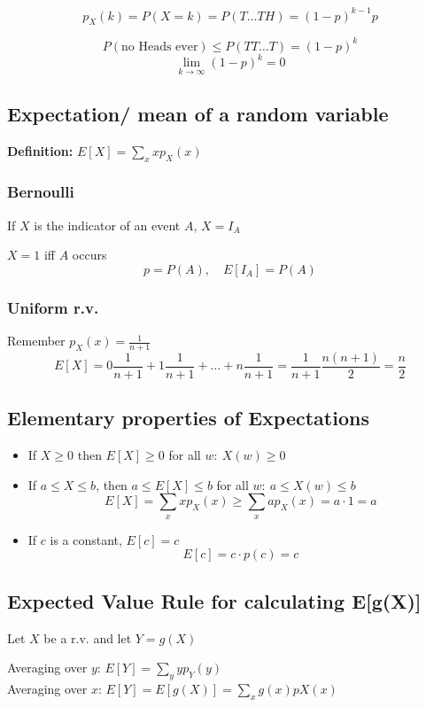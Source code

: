\documentclass{article}
\begin{document}
\[
p_X(k) = P(X=k) = P(T\dots TH) = (1-p)^{k-1} p
\]

\[
P(\text{no Heads ever}) \leq P(TT\dots T) = (1-p)^k 
\]
\[
\lim_{k\to\infty}{(1-p)^k} = 0
\]

\subsection*{Expectation/ mean of a random variable}
\textbf{Definition:} \(E[X] = \sum_{x} xp_X(x)\)

\subsubsection*{Bernoulli}
If \(X\) is the indicator of an event \(A\), \(X = I_A\)

\(X=1\) iff \(A\) occurs
\[
p = P(A), \quad E[I_A] = P(A)
\]

\subsubsection*{Uniform r.v.}
Remember \(p_X(x)= \frac{1}{n+1}\)
\[
E[X] = 0 \frac{1}{n+1} + 1 \frac{1}{n+1} + \dots + n \frac{1}{n+1} = \frac{1}{n+1} \frac{n(n+1)}{2} = \frac{n}{2}
\]

\subsection*{Elementary properties of Expectations}
\begin{itemize}
    \item If \(X \geq 0\) then \(E[X] \geq 0\)
for all \(w: \ X(w) \geq 0\)
    \item If \(a \leq X \leq b\), then \(a \leq E[X] \leq b\)
for all \(w: \ a \leq X(w) \leq b\)
\[
E[X] = \sum_{x} xp_X(x) \geq \sum_{x} ap_X(x) = a\cdot 1 = a
\]

    \item If \(c\) is a constant, \(E[c] = c\)
\[
E[c] = c \cdot p(c) = c
\]
\end{itemize}

\subsection*{Expected Value Rule for calculating E[g(X)]}
Let \(X\) be a r.v. and let \(Y = g(X)\)

Averaging over \(y\): \(E[Y] = \sum_{y} yp_Y(y)\)
\\

Averaging over \(x\): \(E[Y] = E[g(X)] = \sum_{x} g(x)pX(x)\)
\end{document}
